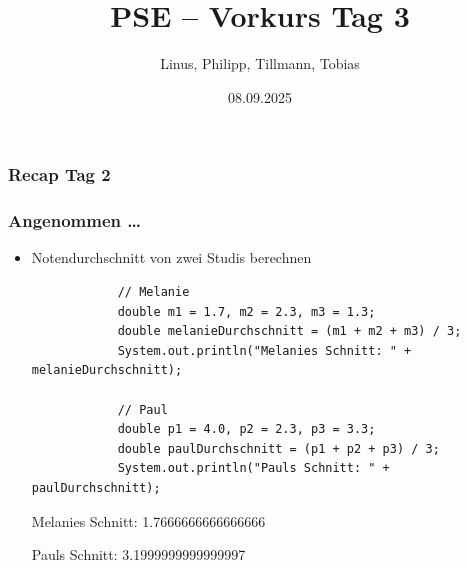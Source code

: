 \documentclass{../../presentation}
\title{PSE – Vorkurs Tag 3}
\author{Linus, Philipp, Tillmann, Tobias}
\institute{FIUS - Fachgruppe Informatik Universität Stuttgart}
\date{08.09.2025}
\begin{document}
\begin{frame}
	\titlepage
\end{frame}

\begin{frame}
	\listoftodos
\end{frame}

\begin{frame}
	\frametitle{Recap Tag 2}
\end{frame}

\begin{frame}[fragile]
	\frametitle{Angenommen \dots}
	\begin{itemize}
		\item Notendurchschnitt von zwei Studis berechnen
		      \begin{verbatim}
            // Melanie
            double m1 = 1.7, m2 = 2.3, m3 = 1.3;
            double melanieDurchschnitt = (m1 + m2 + m3) / 3;
            System.out.println("Melanies Schnitt: " + melanieDurchschnitt);

            // Paul
            double p1 = 4.0, p2 = 2.3, p3 = 3.3;
            double paulDurchschnitt = (p1 + p2 + p3) / 3;
            System.out.println("Pauls Schnitt: " + paulDurchschnitt);
        \end{verbatim}
		      \begin{ausgabe}
			      Melanies Schnitt: 1.7666666666666666

			      Pauls Schnitt: 3.1999999999999997
		      \end{ausgabe}
	\end{itemize}
\end{frame}
\end{document}
